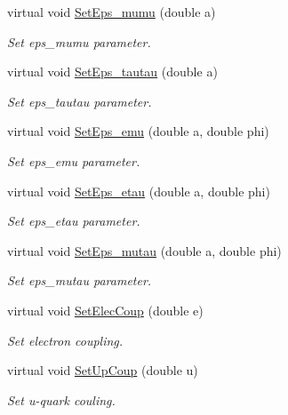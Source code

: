 \begin{DoxyCompactItemize}
virtual void \hyperlink{classOscProb_1_1PMNS__NSI_abf049db9904c745f04346d0d1dedf998}{Set\+Eps\+\_\+mumu} (double a)
\begin{DoxyCompactList}\small\item\em Set eps\+\_\+mumu parameter. \end{DoxyCompactList}\item 
virtual void \hyperlink{classOscProb_1_1PMNS__NSI_a5736f3cd792a621dfa844c3fa314cd17}{Set\+Eps\+\_\+tautau} (double a)
\begin{DoxyCompactList}\small\item\em Set eps\+\_\+tautau parameter. \end{DoxyCompactList}\item 
virtual void \hyperlink{classOscProb_1_1PMNS__NSI_ad5fccd151aea7c673c516b8686f8253c}{Set\+Eps\+\_\+emu} (double a, double phi)
\begin{DoxyCompactList}\small\item\em Set eps\+\_\+emu parameter. \end{DoxyCompactList}\item 
virtual void \hyperlink{classOscProb_1_1PMNS__NSI_a73d43e6d267975d1545af922f8e81bb3}{Set\+Eps\+\_\+etau} (double a, double phi)
\begin{DoxyCompactList}\small\item\em Set eps\+\_\+etau parameter. \end{DoxyCompactList}\item 
virtual void \hyperlink{classOscProb_1_1PMNS__NSI_acfb9893697e04fcc25915ffaf8ed137f}{Set\+Eps\+\_\+mutau} (double a, double phi)
\begin{DoxyCompactList}\small\item\em Set eps\+\_\+mutau parameter. \end{DoxyCompactList}\item 
virtual void \hyperlink{classOscProb_1_1PMNS__NSI_a8e07f5fe44e9ed471efa8e683584e2c7}{Set\+Elec\+Coup} (double e)
\begin{DoxyCompactList}\small\item\em Set electron coupling. \end{DoxyCompactList}\item 
virtual void \hyperlink{classOscProb_1_1PMNS__NSI_a27ecfa2a97c67e6bfb399eeba956f74f}{Set\+Up\+Coup} (double u)
\begin{DoxyCompactList}\small\item\em Set u-\/quark couling. \end{DoxyCompactList}\item 

\end{DoxyCompactItemize}
